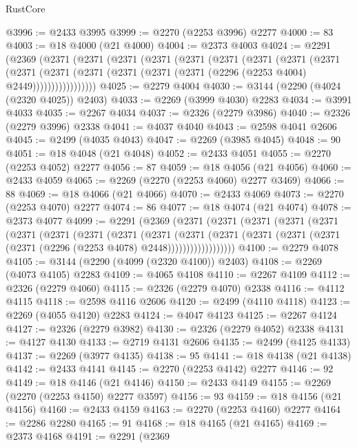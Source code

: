 \begin{lexlean}{RustCore}
\begin{coremodule}
@3996 := @2433 @3995
@3999 := @2270 (@2253 @3996) @2277
@4000 := 83
@4003 := @18 @4000 (@21 @4000)
@4004 := @2373 @4003
@4024 := @2291
    (@2369
      (@2371
        (@2371
          (@2371
            (@2371
              (@2371
                (@2371
                  (@2371
                    (@2371
                      (@2371
                        (@2371
                          (@2371
                            (@2371 (@2371 (@2371 (@2371 (@2296 (@2253 @4004) @2449)))))))))))))))))
@4025 := @2279 @4004
@4030 := @3144 (@2290 (@4024 (@2320 @4025)) @2403)
@4033 := @2269 (@3999 @4030) @2283
@4034 := @3991 @4033
@4035 := @2267 @4034
@4037 := @2326 (@2279 @3986)
@4040 := @2326 (@2279 @3996) @2338
@4041 := @4037 @4040
@4043 := @2598 @4041 @2606
@4045 := @2499 (@4035 @4043)
@4047 := @2269 (@3985 @4045)
@4048 := 90
@4051 := @18 @4048 (@21 @4048)
@4052 := @2433 @4051
@4055 := @2270 (@2253 @4052) @2277
@4056 := 87
@4059 := @18 @4056 (@21 @4056)
@4060 := @2433 @4059
@4065 := @2269 (@2270 (@2253 @4060) @2277 @3469)
@4066 := 88
@4069 := @18 @4066 (@21 @4066)
@4070 := @2433 @4069
@4073 := @2270 (@2253 @4070) @2277
@4074 := 86
@4077 := @18 @4074 (@21 @4074)
@4078 := @2373 @4077
@4099 := @2291
    (@2369
      (@2371
        (@2371
          (@2371
            (@2371
              (@2371
                (@2371
                  (@2371
                    (@2371
                      (@2371
                        (@2371
                          (@2371
                            (@2371
                              (@2371
                                (@2371 (@2371 (@2371 (@2296 (@2253 @4078) @2448))))))))))))))))))
@4100 := @2279 @4078
@4105 := @3144 (@2290 (@4099 (@2320 @4100)) @2403)
@4108 := @2269 (@4073 @4105) @2283
@4109 := @4065 @4108
@4110 := @2267 @4109
@4112 := @2326 (@2279 @4060)
@4115 := @2326 (@2279 @4070) @2338
@4116 := @4112 @4115
@4118 := @2598 @4116 @2606
@4120 := @2499 (@4110 @4118)
@4123 := @2269 (@4055 @4120) @2283
@4124 := @4047 @4123
@4125 := @2267 @4124
@4127 := @2326 (@2279 @3982)
@4130 := @2326 (@2279 @4052) @2338
@4131 := @4127 @4130
@4133 := @2719 @4131 @2606
@4135 := @2499 (@4125 @4133)
@4137 := @2269 (@3977 @4135)
@4138 := 95
@4141 := @18 @4138 (@21 @4138)
@4142 := @2433 @4141
@4145 := @2270 (@2253 @4142) @2277
@4146 := 92
@4149 := @18 @4146 (@21 @4146)
@4150 := @2433 @4149
@4155 := @2269 (@2270 (@2253 @4150) @2277 @3597)
@4156 := 93
@4159 := @18 @4156 (@21 @4156)
@4160 := @2433 @4159
@4163 := @2270 (@2253 @4160) @2277
@4164 := @2286 @2280
@4165 := 91
@4168 := @18 @4165 (@21 @4165)
@4169 := @2373 @4168
@4191 := @2291
    (@2369

\end{coremodule}
\end{lexlean}
